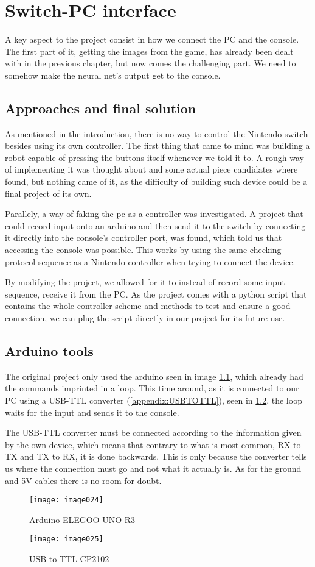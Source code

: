 
\chapter{Switch-PC interface}
A key aspect to the project consist in how we connect the \ac{PC} and the console. The first part of it, getting the images from the game, has already been dealt with in the previous chapter, but now comes the challenging part. We need to somehow make the neural net's output get to the console.

\section{Approaches and final solution}
As mentioned in the introduction, there is no way to control the Nintendo switch besides using its own controller. The first thing that came to mind was building a robot capable of pressing the buttons itself whenever we told it to. A rough way of implementing it was thought about and some actual piece candidates where found, but nothing came of it, as the difficulty of building such device could be a final project of its own.

Parallely, a way of faking the pc as a controller was investigated. A project that could record input onto an arduino and then send it to the switch by connecting it directly into the console's controller port, was found, which told us that accessing the console was possible. This works by using the same checking protocol sequence as a Nintendo controller when trying to connect the device.

By modifying the project, we allowed for it to instead of record some input sequence, receive it from the PC. As the project comes with a python script that contains the whole controller scheme and methods to test and ensure a good connection, we can plug the script directly in our project for its future use.

\section{Arduino tools}
The original project only used the arduino seen in image \ref{arduino}, which already had the commands imprinted in a loop. This time around, as it is connected to our \ac{PC} using a USB-TTL converter (\ref{appendix:USBTOTTL}), seen in \ref{USBtoTTL}, the loop waits for the input and sends it to the console.

The USB-TTL converter must be connected according to the information given by the own device, which means that contrary to what is most common, RX to TX and TX to RX, it is done backwards. This is only because the converter tells us where the connection must go and not what it actually is. As for the ground and 5V cables there is no room for doubt.

\begin{figure}[h]
\centering
\texttt{[image: image024]}
\caption{\label{arduino}Arduino ELEGOO UNO R3}
\end{figure}
\begin{figure}[h]

\centering
\texttt{[image: image025]}
\caption{\label{USBtoTTL}USB to TTL CP2102}
\end{figure}